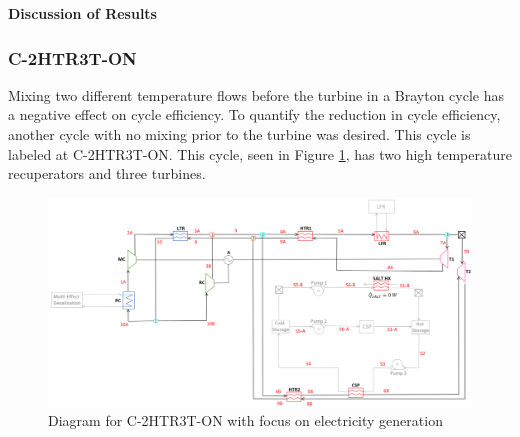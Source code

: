 \begin{paracol}{2}
\textbf{Discussion of Results}

\subsubsection{C-2HTR3T-ON} %

Mixing two different temperature flows before the turbine in a Brayton cycle has a negative effect on cycle efficiency. To quantify the reduction in cycle efficiency, another cycle with no mixing prior to the turbine was desired. This cycle is labeled at C-2HTR3T-ON. This cycle, seen in Figure \ref{c-2htr3t-on}, has two high temperature recuperators and three turbines.

\end{paracol}
\begin{figure}[H]
    \widefigure
    \includegraphics[width=\linewidth]{Definitions/c-2htr3t-on.pdf}
    \caption{Diagram for C-2HTR3T-ON with focus on electricity generation\label{c-2htr3t-on}}
\end{figure}
